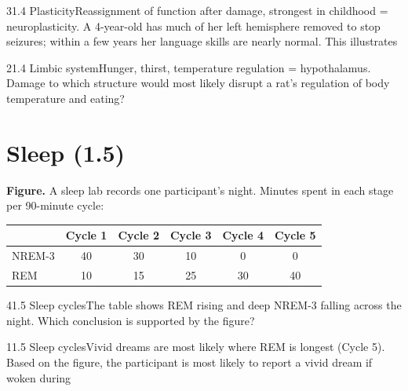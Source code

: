 \documentclass[11pt]{article}
\begin{document}
\begin{q}{3}{1.4 Plasticity}{Reassignment of function after damage, strongest in childhood = neuroplasticity.}
A 4-year-old has much of her left hemisphere removed to stop seizures; within a few years her language skills are nearly normal. This illustrates
\end{q}

\begin{q}{2}{1.4 Limbic system}{Hunger, thirst, temperature regulation = hypothalamus.}
Damage to which structure would most likely disrupt a rat's regulation of body temperature and eating?
\end{q}

\section{Sleep (1.5)}

\begin{stimulus}
\textbf{Figure.} A sleep lab records one participant's night. Minutes spent in each stage per 90-minute cycle:
\begin{center}
\begin{tabular}{lccccc}
\toprule
 & Cycle 1 & Cycle 2 & Cycle 3 & Cycle 4 & Cycle 5\\\midrule
NREM-3 & 40 & 30 & 10 & 0 & 0\\
REM & 10 & 15 & 25 & 30 & 40\\
\bottomrule
\end{tabular}
\end{center}
\end{stimulus}

\begin{q}{4}{1.5 Sleep cycles}{The table shows REM rising and deep NREM-3 falling across the night.}
Which conclusion is supported by the figure?
\end{q}

\begin{q}{1}{1.5 Sleep cycles}{Vivid dreams are most likely where REM is longest (Cycle 5).}
Based on the figure, the participant is most likely to report a vivid dream if woken during
\end{q}
\end{document}
